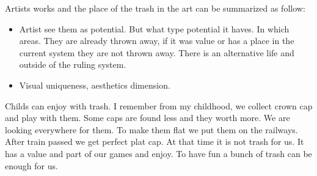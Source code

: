 Artists works and the place of the trash in the art can be summarized as follow:
\begin{itemize}
\item Artist see them as potential. But what type potential it haves. In which areas. They are already thrown away, if it was value or has a place in the current system they are not thrown away. There is an alternative life and outside of the ruling system.
\item Visual uniqueness, aesthetics dimension.
\end{itemize}








Childs can enjoy with trash. I remember from my childhood, we collect crown cap and play with them. Some caps are found less and they worth more. We are looking everywhere for them. To make them flat we put them on the railways. After train passed we get perfect plat cap. At that time it is not trash for us. It has a value and part of our games and enjoy. To have fun a bunch of trash can be enough for us.

